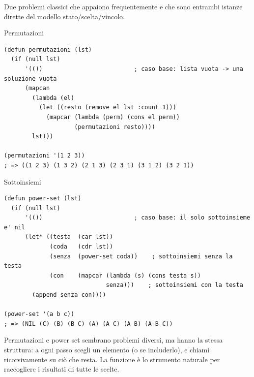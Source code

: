 Due problemi classici che appaiono frequentemente
e che sono entrambi istanze dirette del modello
stato/scelta/vincolo.


\begin{concetto}{Permutazioni}
\end{concetto}

\begin{esempio}
\begin{lstlisting}
(defun permutazioni (lst)
  (if (null lst)
      '(())                          ; caso base: lista vuota -> una soluzione vuota
      (mapcan
        (lambda (el)
          (let ((resto (remove el lst :count 1)))
            (mapcar (lambda (perm) (cons el perm))
                    (permutazioni resto))))
        lst)))

(permutazioni '(1 2 3))
; => ((1 2 3) (1 3 2) (2 1 3) (2 3 1) (3 1 2) (3 2 1))
\end{lstlisting}
\end{esempio}


\begin{concetto}{Sottoinsiemi}
\end{concetto}

\begin{esempio}
\begin{lstlisting}
(defun power-set (lst)
  (if (null lst)
      '(())                          ; caso base: il solo sottoinsieme e' nil
      (let* ((testa  (car lst))
             (coda   (cdr lst))
             (senza  (power-set coda))    ; sottoinsiemi senza la testa
             (con    (mapcar (lambda (s) (cons testa s))
                             senza)))    ; sottoinsiemi con la testa
        (append senza con))))

(power-set '(a b c))
; => (NIL (C) (B) (B C) (A) (A C) (A B) (A B C))
\end{lstlisting}
\end{esempio}

\begin{intuizione}
Permutazioni e power set sembrano problemi diversi,
ma hanno la stessa struttura: a ogni passo scegli
un elemento (o se includerlo), e chiami ricorsivamente
su ciò che resta.
La funzione  è lo strumento naturale
per raccogliere i risultati di tutte le scelte.
\end{intuizione}


